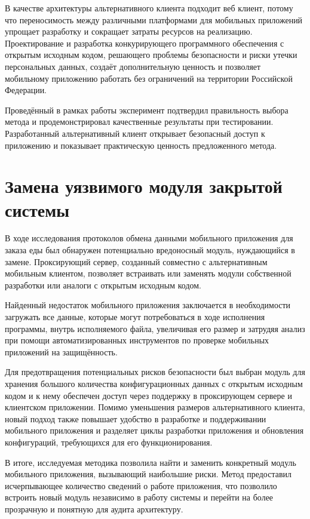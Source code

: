 В качестве архитектуры альтернативного клиента подходит веб клиент, потому что переносимость между различными платформами для мобильных приложений упрощает разработку и сокращает затраты ресурсов на реализацию. Проектирование и разработка конкурирующего программного обеспечения с открытым исходным кодом, решающего проблемы безопасности и риски утечки персональных данных, создаёт дополнительную ценность и позволяет мобильному приложению работать без ограничений на территории Российской Федерации.

Проведённый в рамках работы эксперимент подтвердил правильность выбора метода и продемонстрировал качественные результаты при тестировании. Разработанный альтернативный клиент открывает безопасный доступ к приложению и показывает практическую ценность предложенного метода.

\section{Замена уязвимого модуля закрытой системы}

В ходе исследования протоколов обмена данными мобильного приложения для заказа еды был обнаружен потенциально вредоносный модуль, нуждающийся в замене. Проксирующий сервер, созданный совместно с альтернативным мобильным клиентом, позволяет встраивать или заменять модули собственной разработки или аналоги с открытым исходным кодом.

Найденный недостаток мобильного приложения заключается в необходимости загружать все данные, которые могут потребоваться в ходе исполнения программы, внутрь исполняемого файла, увеличивая его размер и затрудяя анализ при помощи автоматизированных инструментов по проверке мобильных приложений на защищённость.

Для предотвращения потенциальных рисков безопасности был выбран модуль для хранения большого количества конфигурационных данных с открытым исходным кодом и к нему обеспечен доступ через поддержку в проксирующем сервере и клиентском приложении. Помимо уменьшения размеров альтернативного клиента, новый подход также повышает удобство в разработке и поддерживании мобильного приложения и разделяет циклы разработки приложения и обновления конфигураций, требующихся для его функционирования.

В итоге, исследуемая методика позволила найти и заменить конкретный модуль мобильного приложения, вызывающий наибольшие риски. Метод предоставил исчерпывающее количество сведений о работе приложения, что позволило встроить новый модуль независимо в работу системы и перейти на более прозрачную и понятную для аудита архитектуру.

